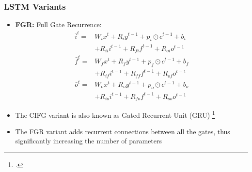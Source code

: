 \documentclass{beamer}
\begin{document}
\begin{frame}
\frametitle{LSTM Variants}
\begin{itemize}
	\item \textbf{FGR:} Full Gate Recurrence:
	\begin{align*}
		\bar{i}^t = &W_i x^t + R_i y^{t-1} + p_i \odot c^{t-1} + b_i \\
					&+ R_{ii} i^{t-1} + R_{fi} f^{t-1} + R_{oi} o^{t-1} \\
		\bar{f}^t = &W_f x^t + R_f y^{t-1} + p_f \odot c^{t-1} + b_f \\
					&+ R_{if} i^{t-1} + R_{ff} f^{t-1} + R_{of} o^{t-1} \\
		\bar{o}^t = &W_o x^t + R_o y^{t-1} + p_o \odot c^{t-1} + b_o \\
					&+ R_{io} i^{t-1} + R_{fo} f^{t-1} + R_{oo} o^{t-1}
	\end{align*}
	\item The CIFG variant is also known as Gated Recurrent Unit (GRU) \footcite{DBLP:journals/corr/ChoMGBSB14}
	\item The FGR variant adds recurrent connections between all the gates, thus significantly increasing the number of parameters
\end{itemize}
\end{frame}
\end{document}
